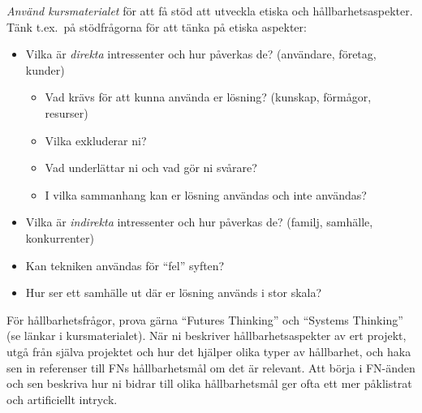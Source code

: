 \emph{Använd kursmaterialet} för att få stöd att utveckla etiska och hållbarhetsaspekter.
Tänk t.ex.~på stödfrågorna för att tänka på etiska aspekter:
\begin{itemize}
\item Vilka är \emph{direkta} intressenter och hur påverkas de? (användare, företag, kunder)
\begin{itemize}
\item  Vad krävs för att kunna använda er lösning? (kunskap, förmågor, resurser)
\item  Vilka exkluderar ni?
\item  Vad underlättar ni och vad gör ni svårare?
\item  I vilka sammanhang kan er lösning användas och inte användas?
\end{itemize}
\item  Vilka är \emph{indirekta} intressenter och hur påverkas de? (familj, samhälle, konkurrenter)
\item  Kan tekniken användas för ``fel'' syften?
\item  Hur ser ett samhälle ut där er lösning används i stor skala?
\end{itemize}

För hållbarhetsfrågor, prova gärna ``Futures Thinking'' och ``Systems Thinking'' (se länkar i kursmaterialet). 
När ni beskriver hållbarhetsaspekter av ert projekt, utgå från själva projektet och hur det hjälper olika typer av hållbarhet, och haka sen in referenser till FNs hållbarhetsmål om det är relevant. Att börja i FN-änden och sen beskriva hur ni bidrar till olika hållbarhetsmål ger ofta ett mer påklistrat och artificiellt intryck.

